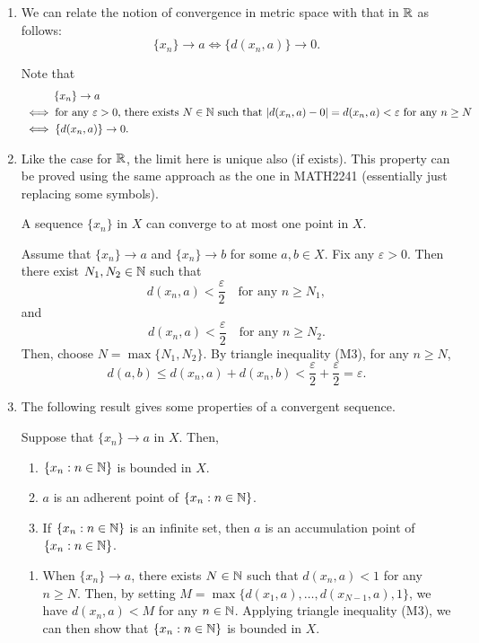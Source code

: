 \begin{enumerate}
\item \label{it:ms-conv-relate-real-conv} We can relate the notion of
convergence in metric space with that in \(\mathbb{R}\) as follows:
\[\{x_n\}\to a\iff \{d(x_n,a)\}\to 0.\]
\begin{pf}
Note that
\begin{align*}
&\hspace{1cm}\{x_n\}\to a\\
&\iff \text{for any \(\varepsilon>0\), there exists \(N\in\mathbb{N}\) such that \(|d(x_n,a)-0|=d(x_n,a)<\varepsilon\) for any \(n\ge N\)}\\
&\iff \{d(x_n,a)\}\to 0.
\end{align*}
\end{pf}
\item Like the case for \(\mathbb{R}\), the limit here is unique also (if exists). This
property can be proved using the same approach as the one in MATH2241
(essentially just replacing some symbols).
\begin{proposition}
\label{prp:limit-uniqueness}
A sequence \(\{x_n\}\) in \(X\) can converge to at most one point in \(X\).
\end{proposition}
\begin{pf}
Assume that \(\{x_n\}\to a\) and \(\{x_n\}\to b\) for some \(a,b\in X\).  Fix
any \(\varepsilon>0\). Then there exist \(N_1,N_2\in \mathbb{N}\) such that
\[
d(x_n,a)<\frac{\varepsilon}{2}\quad\text{for any \(n\ge N_1\)},
\]
and
\[
d(x_n,a)<\frac{\varepsilon}{2}\quad\text{for any \(n\ge N_2\)}.
\]
Then, choose \(N=\max\{N_1,N_2\}\). By triangle inequality (M3), for any \(n\ge
N\),
\[
d(a,b)\le d(x_n,a)+d(x_n,b)<\frac{\varepsilon}{2}+\frac{\varepsilon}{2}=\varepsilon.
\]
\end{pf}
\item The following result gives some properties of a convergent sequence.
\begin{proposition}
\label{prp:conv-seq-prop}
Suppose that \(\{x_n\}\to a\) in \(X\). Then,
\begin{enumerate}
\item \(\{x_n:n\in\mathbb{N}\}\) is bounded in \(X\).
\item \(a\) is an adherent point of \(\{x_n:n\in\mathbb{N}\}\).
\item If \(\{x_n:n\in\mathbb{N}\}\) is an infinite set, then \(a\) is an accumulation
point of \(\{x_n:n\in\mathbb{N}\}\).
\end{enumerate}
\end{proposition}
\begin{pf}
\begin{enumerate}
\item When \(\{x_n\}\to a\), there exists \(N\in\mathbb{N}\) such that \(d(x_n,a)<1\)
for any \(n\ge N\). Then, by setting
\(M=\max\{d(x_1,a),\dotsc,d(x_{N-1},a),1\}\), we have \(d(x_n,a)<M\) for any
\(n\in\mathbb{N}\). Applying triangle inequality (M3), we can then show that
\(\{x_n:n\in\mathbb{N}\}\) is bounded in \(X\).


\end{enumerate}
\end{pf}
\end{enumerate}

